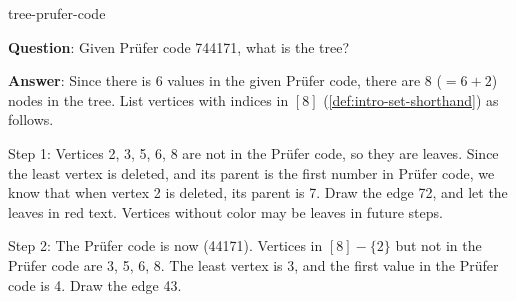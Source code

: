 \documentclass[../src/handouts/main.tex]{subfiles}
\begin{document}
\begin{example}[breakable]{}{tree-prufer-code}
  \def\nd{1cm}%

  \textbf{Question}: Given Prüfer code 744171, what is the tree?

  \textbf{Answer}: Since there is 6 values in the given Prüfer code, there are 8 ($ = 6 + 2$) nodes in the tree. List vertices with indices in $[8]$ (\cref{def:intro-set-shorthand}) as follows.

  \begin{center}
  \end{center}

  Step 1: Vertices 2, 3, 5, 6, 8 are not in the Prüfer code, so they are leaves. Since the least vertex is deleted, and its parent is the first number in Prüfer code, we know that when vertex 2 is deleted, its parent is 7. Draw the edge 72, and let the leaves in red text. Vertices without color may be leaves in future steps.

  \begin{center}
  \end{center}

  Step 2: The Prüfer code is now (44171). Vertices in $[8] - \{2\}$ but not in the Prüfer code are 3, 5, 6, 8. The least vertex is 3, and the first value in the Prüfer code is 4. Draw the edge 43.

  \begin{center}
  \end{center}


\end{example}
\end{document}
